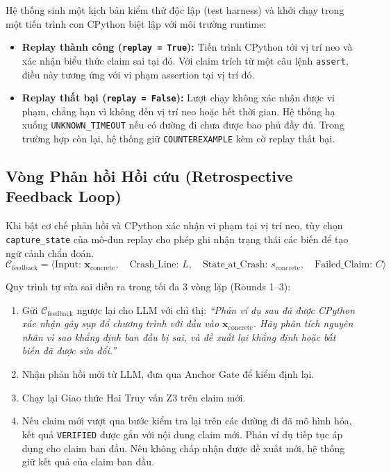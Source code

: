 Hệ thống sinh một kịch bản kiểm thử độc lập (test harness) và khởi chạy trong một tiến trình con CPython biệt lập với môi trường runtime:
\begin{itemize}
    \item \textbf{Replay thành công (\texttt{replay = True}):} Tiến trình CPython tới vị trí neo và xác nhận biểu thức claim sai tại đó. Với claim trích từ một câu lệnh \texttt{assert}, điều này tương ứng với vi phạm assertion tại vị trí đó.
    \item \textbf{Replay thất bại (\texttt{replay = False}):} Lượt chạy không xác nhận được vi phạm, chẳng hạn vì không đến vị trí neo hoặc hết thời gian. Hệ thống hạ xuống \texttt{UNKNOWN\_TIMEOUT} nếu có đường đi chưa được bao phủ đầy đủ. Trong trường hợp còn lại, hệ thống giữ \texttt{COUNTEREXAMPLE} kèm cờ replay thất bại.
\end{itemize}

\subsection{Vòng Phản hồi Hồi cứu (Retrospective Feedback Loop)}
Khi bật cơ chế phản hồi và CPython xác nhận vi phạm tại vị trí neo, tùy chọn \texttt{capture\_state} của mô-đun replay cho phép ghi nhận trạng thái các biến để tạo ngữ cảnh chẩn đoán.
\begin{equation}
\mathcal{C}_{\text{feedback}} = \langle \text{Input: } \mathbf{x}_{\text{concrete}}, \quad \text{Crash\_Line: } L, \quad \text{State\_at\_Crash: } s_{\text{concrete}}, \quad \text{Failed\_Claim: } C \rangle
\end{equation}

Quy trình tự sửa sai diễn ra trong tối đa 3 vòng lặp (Rounds 1--3):
\begin{enumerate}
    \item Gửi $\mathcal{C}_{\text{feedback}}$ ngược lại cho LLM với chỉ thị: \textit{``Phản ví dụ sau đã được CPython xác nhận gây sụp đổ chương trình với đầu vào $\mathbf{x}_{\text{concrete}}$. Hãy phân tích nguyên nhân vì sao khẳng định ban đầu bị sai, và đề xuất lại khẳng định hoặc bất biến đã được sửa đổi.''}
    \item Nhận phản hồi mới từ LLM, đưa qua Anchor Gate để kiểm định lại.
    \item Chạy lại Giao thức Hai Truy vấn Z3 trên claim mới.
    \item Nếu claim mới vượt qua bước kiểm tra lại trên các đường đi đã mô hình hóa, kết quả \texttt{VERIFIED} được gắn với nội dung claim mới. Phản ví dụ tiếp tục áp dụng cho claim ban đầu. Nếu không chấp nhận được đề xuất mới, hệ thống giữ kết quả của claim ban đầu.
\end{enumerate}

